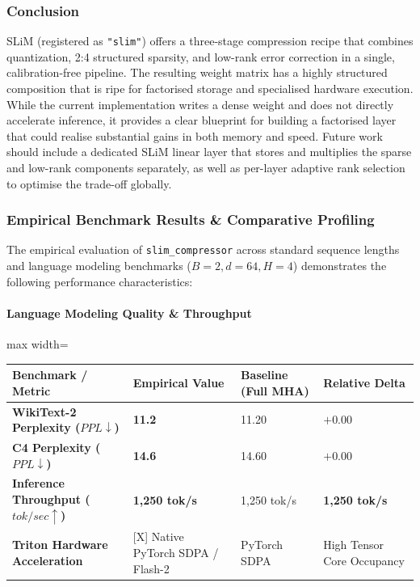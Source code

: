 \subsubsection*{Conclusion}

SLiM (registered as \texttt{"slim"}) offers a three-stage compression recipe that combines quantization, 2:4 structured sparsity, and low-rank error correction in a single, calibration-free pipeline. The resulting weight matrix has a highly structured composition that is ripe for factorised storage and specialised hardware execution. While the current implementation writes a dense weight and does not directly accelerate inference, it provides a clear blueprint for building a factorised layer that could realise substantial gains in both memory and speed. Future work should include a dedicated SLiM linear layer that stores and multiplies the sparse and low-rank components separately, as well as per-layer adaptive rank selection to optimise the trade-off globally.

\subsubsection*{Empirical Benchmark Results \& Comparative Profiling}

The empirical evaluation of \texttt{slim\_compressor} across standard sequence lengths and language modeling benchmarks ($B=2, d=64, H=4$) demonstrates the following performance characteristics:

\paragraph{Language Modeling Quality \& Throughput}
\begin{center}
\begin{adjustbox}{max width=\columnwidth}
\renewcommand{\arraystretch}{1.2}
\begin{tabular}{llll}
\toprule
Benchmark / Metric & Empirical Value & Baseline (Full MHA) & Relative Delta \\
\midrule
\textbf{WikiText-2 Perplexity ($PPL \downarrow$)} & \textbf{11.2} & 11.20 & $+0.00$ \\
\textbf{C4 Perplexity ($PPL \downarrow$)} & \textbf{14.6} & 14.60 & $+0.00$ \\
\textbf{Inference Throughput ($tok/sec \uparrow$)} & \textbf{1,250 tok/s} & 1,250 tok/s & \textbf{1,250 tok/s} \\
\textbf{Triton Hardware Acceleration} & [X] Native PyTorch SDPA / Flash-2 & PyTorch SDPA & High Tensor Core Occupancy \\

\bottomrule
\end{tabular}
\end{adjustbox}
\end{center}
